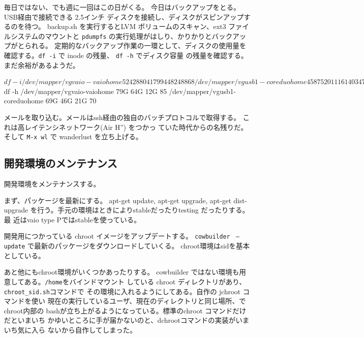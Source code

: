 \documentclass[mingoth,a4paper]{jsarticle}
\begin{document}
毎日ではない、でも週に一回はこの日がくる。
今日はバックアップをとる。USB経由で接続できる 2.5インチ
ディスクを接続し、ディスクがスピンアップするのを待つ。
backup.sh を実行するとLVM ボリュームのスキャン、ext3 ファイルシステムのマウントと
\texttt{pdumpfs} の実行処理がはしり、かりかりとバックアップがとられる。
定期的なバックアップ作業の一環として、ディスクの使用量を確認する。\texttt{df -i} で inode の残量、 \texttt{df -h} でディスク容量
の残量を確認する。まだ余裕があるようだ。

\begin{commandline}
$ df -i 
/dev/mapper/vgvaio-vaiohome
                     5242880  417994 4824886    8%
/dev/mapper/vgusb1-coreduohome
                     4587520 1116140 3471380   25%
$ df -h 
/dev/mapper/vgvaio-vaiohome
                       79G   64G   12G  85%
/dev/mapper/vgusb1-coreduohome
                       69G   46G   21G  70%

\end{commandline}

メールを取り込む。メールはssh経由の独自のバッチプロトコルで取得する。
これは高レイテンシネットワーク(Air H'') をつかっ
ていた時代からの名残りだ。
そして \texttt{M-x wl} で wanderlust を立ち上げる。

\subsection{開発環境のメンテナンス}

開発環境をメンテナンスする。

まず、パッケージを最新にする。 apt-get update, apt-get upgrade, apt-get
dist-upgrade を行う。手元の環境はときによりstableだったりtesting だったりする。最
近はvaio type Pではstableを使っている。

開発用につかっている chroot イメージをアップデートする。
\texttt{cowbuilder　--update} で最新のパッケージをダウンロードしていくる。
chroot環境はsidを基本としている。

あと他にもchroot環境がいくつかあったりする。
cowbuilder ではない環境も用意してある。\texttt{/home}をバインドマウント
している chroot ディレクトリがあり、\verb!chroot_sid.sh!コマンドで
その環境に入れるようにしてある。自作の jchroot コマンドを使い
現在の実行しているユーザ、現在のディレクトリと同じ場所、でchroot内部の
bashが立ち上がるようになっている。標準のchroot コマンドだけだといまいち
かゆいところに手が届かないのと、dchrootコマンドの実装がいまいち気に入ら
ないから自作してしまった。
\end{document}
